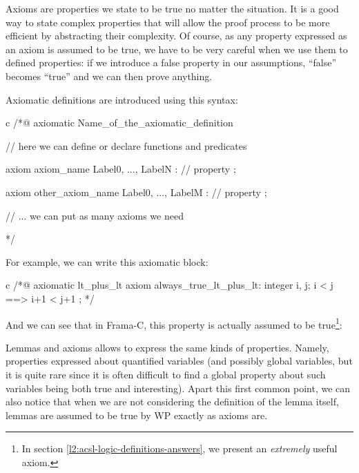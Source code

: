 Axioms are properties we state to be true no matter the situation. It is
a good way to state complex properties that will allow the proof process
to be more efficient by abstracting their complexity. Of course, as any
property expressed as an axiom is assumed to be true, we have to be very
careful when we use them to defined properties: if we introduce a false
property in our assumptions, ``false'' becomes ``true'' and we can then
prove anything.





Axiomatic definitions are introduced using this syntax:



\begin{CodeBlock}{c}
/*@
  axiomatic Name_of_the_axiomatic_definition {
    // here we can define or declare functions and predicates

    axiom axiom_name { Label0, ..., LabelN }:
      // property ;

    axiom other_axiom_name { Label0, ..., LabelM }:
      // property ;

    // ... we can put as many axioms we need
  }
*/
\end{CodeBlock}



For example, we can write this axiomatic block:



\begin{CodeBlock}{c}
/*@
  axiomatic lt_plus_lt{
    axiom always_true_lt_plus_lt:
      \forall integer i, j; i < j ==> i+1 < j+1 ;
  }
*/
\end{CodeBlock}



And we can see that in Frama-C, this property is actually assumed to be
true\footnote{In section \ref{l2:acsl-logic-definitions-answers}, we
present an {\em extremely} useful axiom.}:










Lemmas and axioms allows to express the same kinds of properties.
Namely, properties expressed about quantified variables (and possibly
global variables, but it is quite rare since it is often difficult to
find a global property about such variables being both true and
interesting). Apart this first common point, we can also notice that
when we are not considering the definition of the lemma itself, lemmas
are assumed to be true by WP exactly as axioms are.




